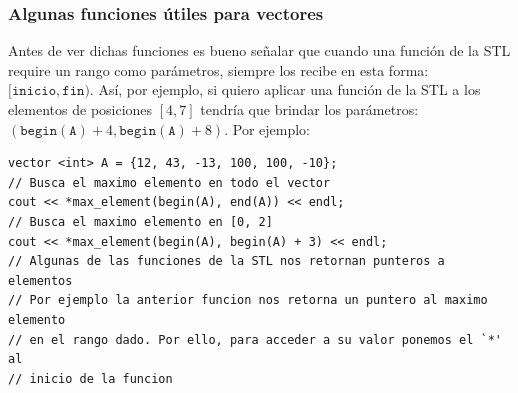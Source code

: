 \documentclass[a4paper,12pt]{article}
\begin{document}
\subsubsection*{Algunas funciones útiles para vectores}
Antes de ver dichas funciones es bueno señalar que cuando una función de la STL require un rango como parámetros, siempre los recibe en esta forma: $[\mathtt{inicio}{,}\mathtt{fin})$. Así, por ejemplo, si quiero aplicar una función de la STL a los elementos de posiciones $[4{,}7]$ tendría que brindar los parámetros: $(\mathtt{begin(A)}+4{,}\mathtt{begin(A)}+8)$. Por ejemplo:
\begin{lstlisting}
vector <int> A = {12, 43, -13, 100, 100, -10};
// Busca el maximo elemento en todo el vector
cout << *max_element(begin(A), end(A)) << endl;
// Busca el maximo elemento en [0, 2]
cout << *max_element(begin(A), begin(A) + 3) << endl;
// Algunas de las funciones de la STL nos retornan punteros a elementos
// Por ejemplo la anterior funcion nos retorna un puntero al maximo elemento
// en el rango dado. Por ello, para acceder a su valor ponemos el `*' al
// inicio de la funcion
\end{lstlisting}
\end{document}
